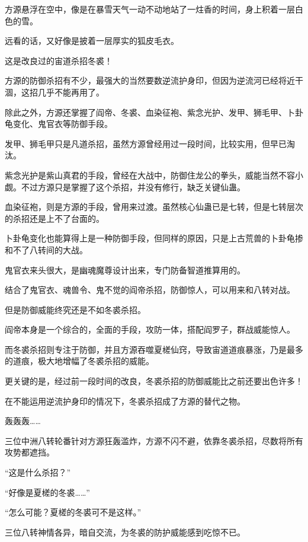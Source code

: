 
\begin{this_body}



方源悬浮在空中，像是在暴雪天气一动不动地站了一炷香的时间，身上积着一层白色的雪。

远看的话，又好像是披着一层厚实的狐皮毛衣。

这是改良过的宙道杀招冬裘！

方源的防御杀招有不少，最强大的当然要数逆流护身印，但因为逆流河已经将近干涸，这招几乎不能再用了。

除此之外，方源还掌握了阎帝、冬裘、血染征袍、紫念光护、发甲、狮毛甲、卜卦龟变化、鬼官衣等防御手段。

发甲、狮毛甲只是凡道杀招，虽然方源曾经用过一段时间，比较实用，但早已淘汰。

紫念光护是紫山真君的手段，曾经在大战中，防御住龙公的拳头，威能当然不容小觑。不过方源只是掌握了这个杀招，并没有修行，缺乏关键仙蛊。

血染征袍，则是方源的手段，曾用来过渡。虽然核心仙蛊已是七转，但是七转层次的杀招还是上不了台面的。

卜卦龟变化也能算得上是一种防御手段，但同样的原因，只是上古荒兽的卜卦龟掺和不了八转间的大战。

鬼官衣来头很大，是幽魂魔尊设计出来，专门防备智道推算用的。

结合了鬼官衣、魂兽令、鬼不觉的阎帝杀招，防御惊人，可以用来和八转对战。

但是防御威能终究还是不如冬裘杀招。

阎帝本身是一个综合的，全面的手段，攻防一体，搭配阎罗子，群战威能惊人。

而冬裘杀招则专注于防御，并且方源吞噬夏槎仙窍，导致宙道道痕暴涨，乃是最多的道痕，极大地增幅了冬裘杀招的威能。

更关键的是，经过前一段时间的改良，冬裘杀招的防御威能比之前还要出色许多！

在不能运用逆流护身印的情况下，冬裘杀招成了方源的替代之物。

轰轰轰……

三位中洲八转轮番针对方源狂轰滥炸，方源不闪不避，依靠冬裘杀招，尽数将所有攻势都遮挡。

“这是什么杀招？”

“好像是夏槎的冬裘……”

“怎么可能？夏槎的冬裘可不是这样。”

三位八转神情各异，暗自交流，为冬裘的防护威能感到吃惊不已。


\end{this_body}
